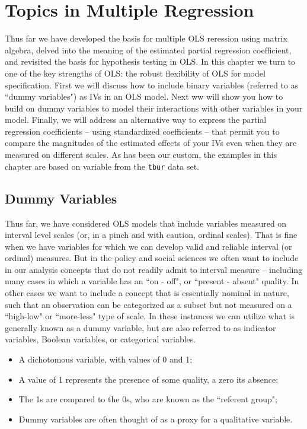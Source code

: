 \documentclass[11pt,openany]{book}
\begin{document}
\chapter{Topics in Multiple Regression}


Thus far we have developed the basis for multiple OLS reression using matrix algebra, delved into the meaning of the estimated partial regression coefficient, and revisited the basis for hypothesis testing in OLS. In this chapter we turn to one of the key strengths of OLS: the robust flexibility of OLS for model specification. First we will discuss how to include binary variables (referred to as ``dummy variables") as IVs in an OLS model. Next ww will show you how to build on dummy variables to model their interactions with other variables in your model. Finally, we will address an alternative way to express the partial regression coefficients -- using standardized coefficients -- that permit you to compare the magnitudes of the estimated effects of your IVs even when they are measured on different scales. As has been our custom, the examples in this chapter are based on variable from the \texttt{tbur} data set.  

\section{Dummy Variables} 

Thus far, we have considered OLS models that include variables measured on interval level scales (or, in a pinch and with caution, ordinal scales). That is fine when we have variables for which we can develop valid and reliable interval (or ordinal) measures. But in the policy and social sciences we often want to include in our analysis concepts that do not readily admit to interval measure -- including many cases in which a variable has an ``on - off", or ``present - absent" quality. In other cases we want to include a concept that is essentially nominal in nature, such that an observation can be categorized as a subset but not measured on a ``high-low" or ``more-less" type of scale. In these instances we can utilize what is generally known as a dummy variable, but are also referred to as indicator variables, Boolean variables, or categorical variables.

\begin{grbox}

\begin{itemize}  
\item A dichotomous variable, with values of 0 and 1;
\item A value of 1 represents the presence of some quality, a zero its absence;
\item The 1s are compared to the 0s, who are known as the ``referent group";
\item Dummy variables are often thought of as a proxy for a qualitative variable.
\end{itemize}  
\end{grbox}
\end{document}
